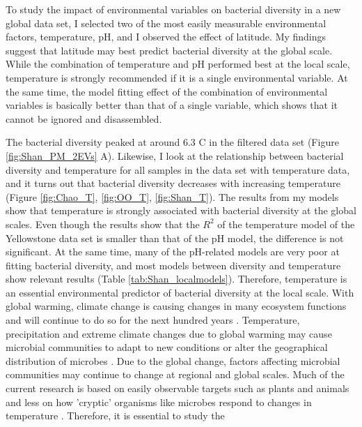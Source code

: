 \documentclass[11pt, a4paper]{article}
\begin{document}
\begin{spacing}{1.5}
To study the impact of environmental variables on bacterial diversity in a new global data set, I selected two of the most easily measurable environmental factors, temperature, pH, and I observed the effect of latitude. My findings suggest that latitude may best predict bacterial diversity at the global scale. While the combination of temperature and pH performed best at the local scale, temperature is strongly recommended if it is a single environmental variable. At the same time, the model fitting effect of the combination of environmental variables is basically better than that of a single variable, which shows that it cannot be ignored and disassembled.

The bacterial diversity peaked at around 6.3 \textdegree C in the filtered data set (Figure \ref{fig:Shan_PM_2EVs} A). Likewise, I look at the relationship between bacterial diversity and temperature for all samples in the data set with temperature data, and it turns out that bacterial diversity decreases with increasing temperature (Figure \ref{fig:Chao_T}, \ref{fig:OO_T}, \ref{fig:Shan_T}). The results from my models show that temperature is strongly associated with bacterial diversity at the global scales. Even though the results show that the $R^{2}$ of the temperature model of the Yellowstone data set is smaller than that of the pH model, the difference is not significant. At the same time, many of the pH-related models are very poor at fitting bacterial diversity, and most models between diversity and temperature show relevant results (Table \ref{tab:Shan_localmodels}). Therefore, temperature is an essential environmental predictor of bacterial diversity at the local scale. With global warming, climate change is causing changes in many ecosystem functions and will continue to do so for the next hundred years \citep{smith2018predicted}. Temperature, precipitation and extreme climate changes due to global warming may cause microbial communities to adapt to new conditions or alter the geographical distribution of microbes \citep{leducq2014local}. Due to the global change, factors affecting microbial communities may continue to change at regional and global scales. Much of the current research is based on easily observable targets such as plants and animals \citep{chen2011rapid, colwell2008global} and less on how 'cryptic' organisms like microbes respond to changes in temperature \citep{RePEc:nat:nature:v:463:y:2010:i:7279:d:10.1038_463293c}. Therefore, it is essential to study the 

\end{spacing}
\end{document}
